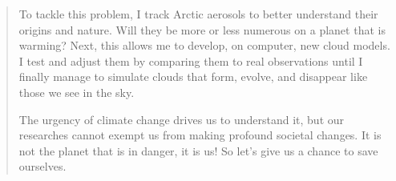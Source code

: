 \begin{quote}
    To tackle this problem, I track Arctic
    aerosols to better understand their origins and nature.
    Will they be more or less numerous on a
    planet that is warming?
    Next, this allows me to develop, on computer,
    new cloud models.
    I test and adjust them by comparing them to
    real observations until I finally manage to simulate
    clouds that form, evolve, and disappear like those we
    see in the sky.\
    
    The urgency of climate change drives us to
    understand it, but our researches cannot exempt us
    from making profound societal changes.
    It is not the planet that is in danger, it is us!
    So let's give us a chance to save ourselves.

\end{quote}    


